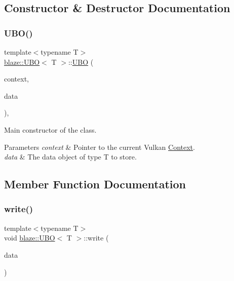 \subsection{Constructor \& Destructor Documentation}
\mbox{\label{classblaze_1_1UBO_a3df93d52c42c21080258f142862490bd}} 
\subsubsection{\texorpdfstring{U\+B\+O()}{UBO()}}
{\footnotesize\ttfamily template$<$typename T$>$ \\
\hyperlink{classblaze_1_1UBO}{blaze\+::\+U\+BO}$<$ T $>$\+::\hyperlink{classblaze_1_1UBO}{U\+BO} (\begin{DoxyParamCaption}\item[{const \hyperlink{classblaze_1_1Context}{Context} $\ast$}]{context,  }\item[{const T \&}]{data }\end{DoxyParamCaption})\hspace{0.3cm}{\ttfamily [inline]}, {\ttfamily [noexcept]}}



Main constructor of the class. 


\begin{DoxyParams}{Parameters}
{\em context} & Pointer to the current Vulkan \hyperlink{classblaze_1_1Context}{Context}. \\
\hline
{\em data} & The data object of type T to store. \\
\hline
\end{DoxyParams}


\subsection{Member Function Documentation}
\mbox{\label{classblaze_1_1UBO_a67e905adc995d3f0a8ec47208992674d}} 
\subsubsection{\texorpdfstring{write()}{write()}}
{\footnotesize\ttfamily template$<$typename T$>$ \\
void \hyperlink{classblaze_1_1UBO}{blaze\+::\+U\+BO}$<$ T $>$\+::write (\begin{DoxyParamCaption}\item[{const T \&}]{data }\end{DoxyParamCaption})\hspace{0.3cm}{\ttfamily [inline]}}



